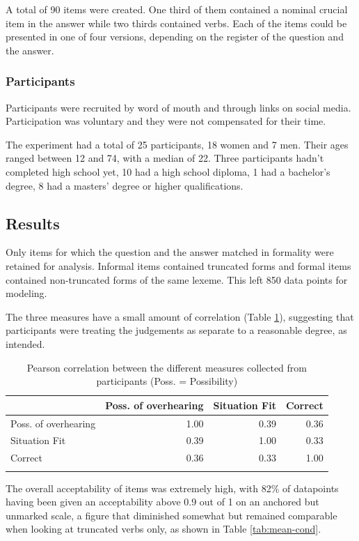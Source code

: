 \documentclass[output=paper,colorlinks,citecolor=brown]{langscibook}
\begin{document}
A total of 90 items were created. One third of them contained a nominal crucial item in the answer while two thirds contained verbs. Each of the items could be presented in one of four versions, depending on the register of the question and the answer.

\subsubsection{Participants}

Participants were recruited by word of mouth and through links on social media. Participation was voluntary and they were not compensated for their time.

The experiment had a total of 25 participants, 18 women and 7 men. Their ages ranged between 12 and 74, with a median of 22. Three participants hadn't completed high school yet, 10 had a high school diploma, 1 had a bachelor's degree, 8 had a masters' degree or higher qualifications.

\subsection{Results}
Only items for which the question and the answer matched in formality were retained for analysis. Informal items contained truncated forms and formal items contained non-truncated forms of the same lexeme. This left 850 data points for modeling.

The three measures have a small amount of correlation (Table \ref{tab:corr-measures}), suggesting that participants were treating the judgements as separate to a reasonable degree, as intended.

\begin{table}[ht]
	\centering
	\begin{tabular}{lrrr}
		\lsptoprule
		& Poss. of overhearing & Situation Fit & Correct \\ 
		\midrule
		Poss. of overhearing & 1.00 & 0.39 & 0.36 \\ 
		Situation Fit & 0.39 & 1.00 & 0.33 \\ 
		Correct & 0.36 & 0.33 & 1.00 \\ 
		\lspbottomrule
	\end{tabular}
	\caption{Pearson correlation between the different measures collected from participants (Poss. = Possibility)}
	\label{tab:corr-measures}
\end{table}


The overall acceptability of items was extremely high, with 82\% of datapoints having been given an acceptability above 0.9 out of 1 on an anchored but unmarked scale, a figure that diminished somewhat but remained comparable when looking at truncated verbs only, as shown in Table \ref{tab:mean-cond}.
\end{document}

